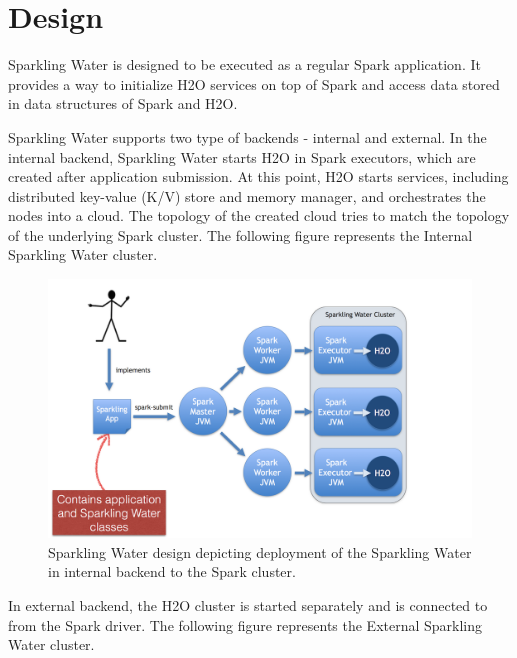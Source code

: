 \documentclass{standalone}
\begin{document}
    \section{Design}
    Sparkling Water is designed to be executed as a regular Spark application. It provides a way to initialize H2O
    services on top of Spark and access data stored in data structures of Spark and H2O.

    Sparkling Water supports two type of backends - internal and external. In the internal backend, Sparkling Water starts
    H2O in Spark executors, which are created after application submission. At this point, H2O starts services,
    including distributed key-value (K/V) store and memory manager, and orchestrates the nodes into a cloud.
    The topology of the created cloud tries to match the topology of the underlying Spark cluster.
    The following figure represents the Internal Sparkling Water cluster.


    \begin{figure}[h!]
        \centering
        \includegraphics[scale=0.6]{../images/Topology-internal.png}
        \caption{Sparkling Water design depicting deployment of the Sparkling Water in internal backend to the Spark cluster.}
    \end{figure}

    In external backend, the H2O cluster is started separately and is connected to from the Spark driver. The
    following figure represents the External Sparkling Water cluster.
\end{document}
